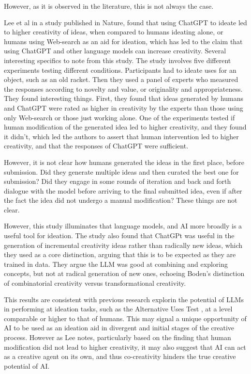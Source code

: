 However, as it is observed in the literature, this is not always the case. 

Lee et al \cite{Lee2024-hd} in a study published in Nature, found that using ChatGPT to ideate led to higher creativity of ideas, when compared to humans ideating alone, or humans using Web-search as an aid for ideation, which has led to the claim that using ChatGPT and other language models can increase creativity. Several interesting specifics to note from this study. The study involves five different experiments testing different conditions. Participants had to ideate uses for an object, such as an old racket. Then they used a panel of experts who measured the responses according to novelty and value, or originality and appropriateness. They found interesting things. First, they found that ideas generated by humans and ChatGPT were rated as higher in creativity by the experts than those using only Web-search or those just working alone. One of the experiments tested if human modification of the generated idea led to higher creativity, and they found it didn't, which led the authors to assert that human intervention led to higher creativity, and that the responses of ChatGPT were sufficient. 

However, it is not clear how humans generated the ideas in the first place, before submission. Did they generate multiple ideas and then curated the best one for submission? Did they engage in some rounds of iteration and back and forth dialogue with the model before arriving to the final submitted idea, even if after the fact the idea did not undergo a manual modification? These things are not clear. 

However, this study illuminates that language models, and AI more broadly is a useful tool for ideation. The study also found that ChatGPt was useful in the generation of incremental creativity ideas rather than radically new ideas, which they used as a core distinction, arguing that this is to be expected as they are trained in data. They argue the LLM was good at combining and exploring concepts, but not at radical generation of new ones, echoeing Boden's distinction of combinatorial creativity versus transformational creativity. 

This results are consistent with previous research explorin the potential of LLMs in performing at ideation tasks, such as the Alternative Uses Test \cite{Hubert2024-kv, Haase2023-vz, Guzik2023-cl}, at a level comparable or higher to that of humans. This may signal a unique opportunity of AI to be used as an ideation aid in divergent and initial stages of the creative process. However as Lee \cite{Lee2024-hd} notes, particularly based on the finding that human modification did not lead to higher creativity, it may also suggest that AI can act as a creative agent on its own, and thus co-creativity hinders the true creative potential of AI. 

